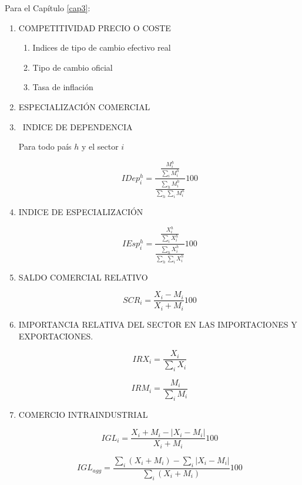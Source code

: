 \documentclass[a4paper,openright,12pt]{book}
\begin{document}
Para el Capítulo \ref{cap3}:

\begin{enumerate}
    \item COMPETITIVIDAD PRECIO O COSTE
    \begin{enumerate}
        \item Indices de tipo de cambio efectivo real
        \item Tipo de cambio oficial
        \item Tasa de inflación
    \end{enumerate}

\item ESPECIALIZACIÓN COMERCIAL

\item  INDICE DE DEPENDENCIA

Para todo país $h$ y el sector $i$

$$IDep^h_i = \frac{\frac{M^h_i}{\sum_i M^h_i}}{\frac{\sum_h M^h_i}{\sum_h \sum_i M^h_i}} 100$$

\item  INDICE DE ESPECIALIZACIÓN

$$IEsp^h_i = \frac{\frac{X^h_i}{\sum_i X^h_i}}{\frac{\sum_h X^h_i}{\sum_h \sum_i X^h_i}} 100$$

\item  SALDO COMERCIAL RELATIVO

$$SCR_i = \frac{X_i - M_i}{X_i + M_i} 100$$

\item IMPORTANCIA RELATIVA DEL SECTOR EN LAS IMPORTACIONES Y EXPORTACIONES.

$$IRX_i = \frac{X_i}{\sum_i X_i}$$

$$IRM_i = \frac{M_i}{\sum_i M_i}$$

\item COMERCIO INTRAINDUSTRIAL

$$IGL_i = \frac{X_i + M_i - |X_i - M_i|}{X_i + M_i}100$$

$$IGL_{agg} = \frac{\sum_i(X_i + M_i) - \sum_i |X_i - M_i|}{\sum_i (X_i + M_i)}100$$

\end{enumerate}


\cleardoublepage
{}

\end{document}
